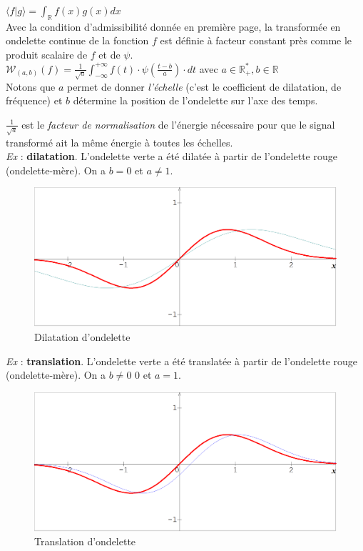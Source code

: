 \documentclass{article}
\begin{document}
$\displaystyle \langle f|g \rangle = \int_{\mathbb{R}} f(x)g(x)dx$ \\

Avec la condition d’admissibilité donnée en première page, la transformée en ondelette continue de la fonction $f$ est définie à facteur constant près comme le produit scalaire de $f$ et de $\psi$. \\

$\displaystyle \mathcal{W}_{(a,b)}(f)= \frac{1}{\sqrt{a}}\int_{-\infty}^{+\infty}f(t)\cdot\psi(\frac{t - b}{a})\cdot dt $ avec $a \in \mathbb{R}_{+}^{*}, b \in \mathbb{R}$ \\

Notons que $a$ permet de donner \textit{l’échelle} (c’est le coefficient de dilatation, de fréquence) et $b$ détermine la position de l’ondelette sur l’axe des temps.

$\frac{1}{\sqrt{a}}$ est le \textit{facteur de normalisation} de l'énergie nécessaire pour que le signal transformé ait la même énergie à toutes les échelles. \\

\textit{Ex} : \textbf{dilatation}.
L’ondelette verte a été dilatée à partir de l’ondelette rouge (ondelette-mère). On a $b = 0$ et $a \neq 1$. \\

\begin{figure}[!h]
\centering
\includegraphics[scale=0.22]{dilatation.png}
\caption{Dilatation d'ondelette}
\label{dilat}
\end{figure}

\textit{Ex} : \textbf{translation}.
L’ondelette verte a été translatée à partir de l’ondelette rouge (ondelette-mère). On a $b \neq 0$ 0 et $a = 1$.

\begin{figure}[!h]
\centering
\includegraphics[scale=0.22]{translation.png}
\caption{Translation d'ondelette}
\label{translat}
\end{figure}
\end{document}
